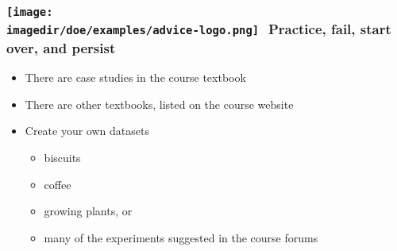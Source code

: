 \begin{frame}\frametitle{\texttt{[image: \\imagedir/doe/examples/advice-logo.png]}\,\, Practice, fail, start over, and persist}

	\begin{itemize}
		\item	There are case studies in the course textbook
		\item	There are other textbooks, listed on the course website
		\item	Create your own datasets
			\begin{itemize}
				\item	biscuits
				\item	coffee
				\item	growing plants, or
				\item	many of the experiments suggested in the course forums
				
			\end{itemize}
	\end{itemize}
\end{frame}



